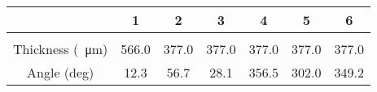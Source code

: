 \documentclass{article}
\begin{document}
    \begin{tabular}{c c c c c c c}
        \toprule
        & 1 & 2 & 3 & 4 & 5 & 6 \\ 
        \midrule\\
        \addlinespace[-2ex]
        Thickness (\SI{}{\micro \meter}) & 566.0 & 377.0 & 377.0 & 377.0 & 377.0 & 377.0  \\
        \addlinespace[1.5ex]
        Angle (deg) & 12.3 & 56.7 & 28.1 & 356.5 & 302.0 & 349.2 \\
        \bottomrule
    \end{tabular}
\end{document}
